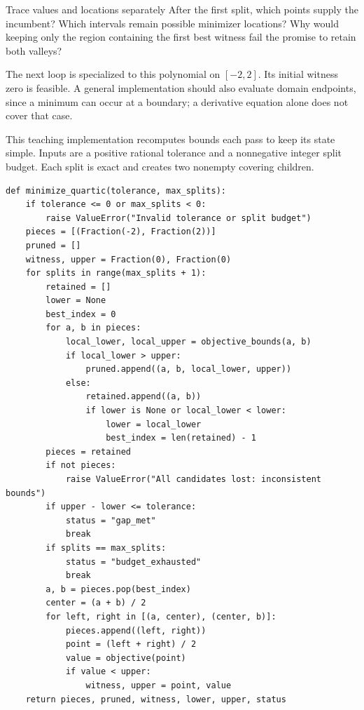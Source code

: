 \begin{question}{Trace values and locations separately}
After the first split, which points supply the incumbent? Which intervals
remain possible minimizer locations? Why would keeping only the region
containing the first best witness fail the promise to retain both valleys?
\end{question}

The next loop is specialized to this polynomial on $[-2,2]$. Its initial
witness zero is feasible. A general implementation should also evaluate
domain endpoints, since a minimum can occur at a boundary; a derivative
equation alone does not cover that case.

\newpage
{}
This teaching implementation recomputes bounds each pass to keep its state
simple. Inputs are a positive rational tolerance and a nonnegative integer
split budget. Each split is exact and creates two nonempty covering children.
\begin{lstlisting}
def minimize_quartic(tolerance, max_splits):
    if tolerance <= 0 or max_splits < 0:
        raise ValueError("Invalid tolerance or split budget")
    pieces = [(Fraction(-2), Fraction(2))]
    pruned = []
    witness, upper = Fraction(0), Fraction(0)
    for splits in range(max_splits + 1):
        retained = []
        lower = None
        best_index = 0
        for a, b in pieces:
            local_lower, local_upper = objective_bounds(a, b)
            if local_lower > upper:
                pruned.append((a, b, local_lower, upper))
            else:
                retained.append((a, b))
                if lower is None or local_lower < lower:
                    lower = local_lower
                    best_index = len(retained) - 1
        pieces = retained
        if not pieces:
            raise ValueError("All candidates lost: inconsistent bounds")
        if upper - lower <= tolerance:
            status = "gap_met"
            break
        if splits == max_splits:
            status = "budget_exhausted"
            break
        a, b = pieces.pop(best_index)
        center = (a + b) / 2
        for left, right in [(a, center), (center, b)]:
            pieces.append((left, right))
            point = (left + right) / 2
            value = objective(point)
            if value < upper:
                witness, upper = point, value
    return pieces, pruned, witness, lower, upper, status
\end{lstlisting}

